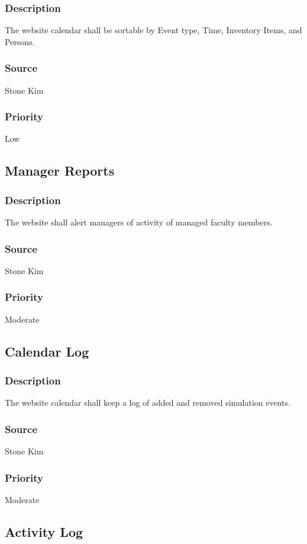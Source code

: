 \subsubsection{Description}
The website calendar shall be sortable by Event type, Time, Inventory Items, and Persons.
\subsubsection{Source}
Stone Kim
\subsubsection{Priority}
Low

\subsection{Manager Reports}
\subsubsection{Description}
The website shall alert managers of activity of managed faculty members.
\subsubsection{Source}
Stone Kim
\subsubsection{Priority}
Moderate

\subsection{Calendar Log}
\subsubsection{Description}
The website calendar shall keep a log of added and removed simulation events.
\subsubsection{Source}
Stone Kim
\subsubsection{Priority}
Moderate

\subsection{Activity Log}
